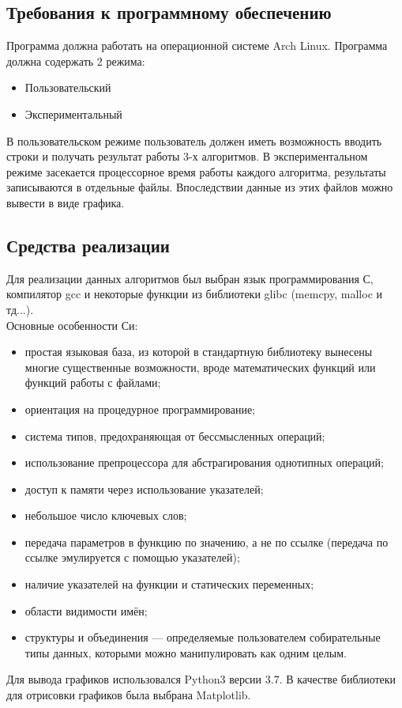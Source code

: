 \documentclass[a4paper,12pt]{article}
\begin{document}
\subsection{Требования к программному обеспечению}

Программа должна работать на операционной системе Arch Linux. Программа должна содержать 2 режима:
\begin{itemize}
\item Пользовательский
\item Экспериментальный
\end{itemize}
В пользовательском режиме пользователь должен иметь возможность вводить строки и получать результат работы 3-х алгоритмов. В экспериментальном режиме засекается процессорное время работы каждого алгоритма, результаты записываются в отдельные файлы. Впоследствии данные из этих файлов можно вывести в виде графика.

\newpage
\subsection{Средства реализации}
Для реализации данных алгоритмов был выбран язык программирования С, компилятор gcc и некоторые функции из библиотеки glibc (memcpy, malloc и тд...). \\
Основные особенности Си:
\begin{itemize}
\item простая языковая база, из которой в стандартную библиотеку вынесены многие существенные возможности, вроде математических функций или функций работы с файлами;
\item ориентация на процедурное программирование;
\item система типов, предохраняющая от бессмысленных операций;
\item использование препроцессора для абстрагирования однотипных операций;
\item доступ к памяти через использование указателей;
\item небольшое число ключевых слов;
\item передача параметров в функцию по значению, а не по ссылке (передача по ссылке эмулируется с помощью указателей);
\item наличие указателей на функции и статических переменных;
\item области видимости имён;
\item структуры и объединения — определяемые пользователем собирательные типы данных, которыми можно манипулировать как одним целым.
\end{itemize}
Для вывода графиков использовался Python3 версии 3.7. В качестве библиотеки для отрисовки графиков была выбрана Matplotlib.
\end{document}
